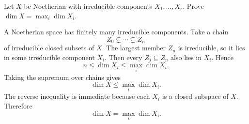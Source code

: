 \begin{problem}\label{prob:vi30-07}
Let \(X\) be Noetherian with irreducible components \(X_1,\ldots,X_r\). Prove \(\dim X=\max_i\dim X_i\).

\end{problem}

\ifdefined\FullProblemDossiers
\begin{solution}
A Noetherian space has finitely many irreducible components. Take a chain
\[
Z_0\subsetneq\cdots\subsetneq Z_n
\]
of irreducible closed subsets of \(X\). The largest member \(Z_n\) is irreducible, so it lies in some irreducible
component \(X_i\). Then every \(Z_j\subseteq Z_n\) also lies in \(X_i\). Hence
\[
n\le\dim X_i\le\max_i\dim X_i.
\]
Taking the supremum over chains gives
\[
\dim X\le\max_i\dim X_i.
\]
The reverse inequality is immediate because each \(X_i\) is a closed subspace of \(X\). Therefore
\[
\boxed{\dim X=\max_i\dim X_i}.
\]
\end{solution}
\fi
